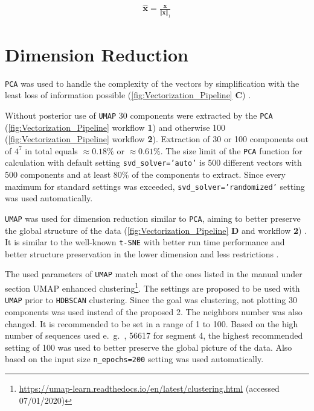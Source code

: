 \begin{equation}\label{eq:norm1}
    \begin{aligned}
        \mathbf{\hat{x}} = \frac{\mathbf{x}}{\Vert\mathbf{x}\Vert_1}
    \end{aligned}
\end{equation}

\section{Dimension Reduction} \label{sec:PCA}

\texttt{PCA} was used to handle the complexity of the vectors by simplification with the least loss of information possible (\autoref{fig:Vectorization_Pipeline} \textsf{\textbf{C}}) \autocite{pearson_liii_1901} \autocite{pedregosa_scikit-learn_2011}.

\vspace{1em}

Without posterior use of \texttt{UMAP} 30 components were extracted by the \texttt{PCA} (\autoref{fig:Vectorization_Pipeline} workflow \textsf{\textbf{1}}) and otherwise 100 (\autoref{fig:Vectorization_Pipeline} workflow \textsf{\textbf{2}}). Extraction of 30 or 100 components out of $4^7$ in total equals $\approx 0.18\%$ or $\approx 0.61\%$. The size limit of the \texttt{PCA} function for calculation with default setting \texttt{svd\_solver='auto'} is 500 different vectors with 500 components and at least 80\% of the components to extract. Since every maximum for standard settings was exceeded, \texttt{svd\_solver='randomized'} setting was used automatically. %

\vspace{1em}

\texttt{UMAP} was used for dimension reduction similar to \texttt{PCA}, aiming to better preserve the global structure of the data (\autoref{fig:Vectorization_Pipeline} \textsf{\textbf{D}} and workflow \textsf{\textbf{2}}) \autocite{mcinnes_umap_2020}. It is similar to the well-known \texttt{t-SNE} with better run time performance and better structure preservation in the lower dimension and less restrictions \autocite{maaten_visualizing_2008, mcinnes_umap_2020}. %

The used parameters of \texttt{UMAP} match most of the ones listed in the manual under section \glqq UMAP enhanced clustering\grqq{}\footnote{\url{https://umap-learn.readthedocs.io/en/latest/clustering.html} (accessed 07/01/2020)}. The settings are proposed to be used with \texttt{UMAP} prior to \texttt{HDBSCAN} clustering. Since the goal was clustering, not plotting 30 components was used instead of the proposed 2. The neighbors number was also changed. It is recommended to be set in a range of 1 to 100. Based on the high number of sequences used e.~g.~, 56617 for segment 4, the highest recommended setting of 100 was used to better preserve the global picture of the data. Also based on the input size \texttt{n\_epochs=200} setting was used automatically.

